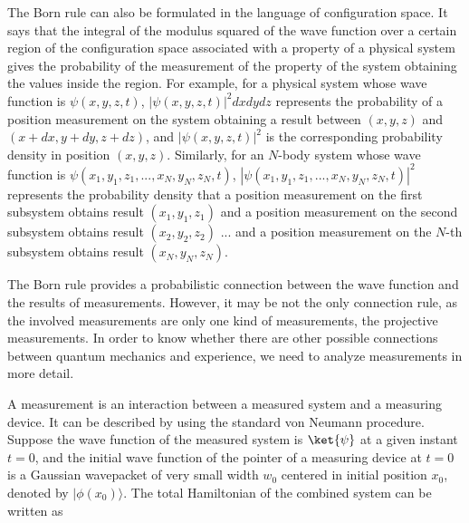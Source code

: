 The Born rule can also be formulated in the language of configuration space. It says that the integral of the modulus squared of the wave function over a certain region of the configuration space associated with a property of a physical system gives the probability of the measurement of the property of the system obtaining the values inside the region. For example, for a physical system whose wave function is $\psi(x,y,z,t)$, $|\psi(x,y,z,t)|^2dxdydz$ represents the probability of a position measurement on the system obtaining a result between $(x,y,z)$ and $(x+dx,y+dy,z+dz)$, and $|\psi(x,y,z,t)|^2$ is the corresponding probability density in position $(x,y,z)$. Similarly, for an $N$-body system whose wave function is $\psi(x_1,y_1,z_1,..., x_N,y_N,z_N,t)$, $|\psi(x_1,y_1,z_1,..., x_N,y_N,z_N,t)|^2$ represents the probability density that a position measurement on the first subsystem obtains result $(x_1,y_1,z_1)$ and a position measurement on the second subsystem obtains result $(x_2,y_2,z_2)$ ... and a position measurement on the $N$-th subsystem obtains result $(x_N,y_N,z_N)$.

The Born rule provides a probabilistic connection between the wave function and the results of measurements. However, it may be not the only connection rule, as the involved measurements are only one kind of measurements, the projective measurements. In order to know whether there are other possible connections between quantum mechanics and experience, we need to analyze measurements in more detail.

A measurement is an interaction between a measured system and a measuring device. It can be described by using the standard von Neumann procedure. Suppose the wave function of the measured system is $\ket{\psi}$ at a given instant $t=0$, and the initial wave function of the pointer of a measuring device at $t=0$ is a Gaussian wavepacket of very small width $w_0$ centered in initial position $x_0$, denoted by $|\phi(x_0)\rangle$.
The total Hamiltonian of the combined system can be written as

